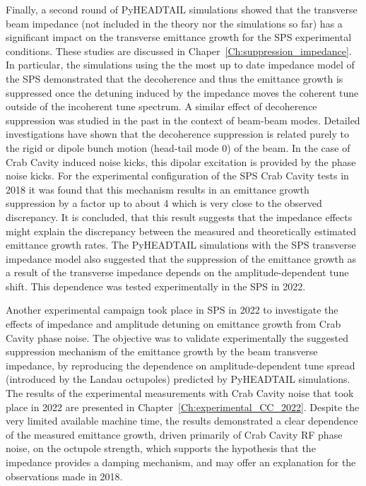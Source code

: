 Finally, a second round of PyHEADTAIL simulations showed that the transverse beam impedance (not included in the theory nor the simulations so far) has a significant impact on the transverse emittance growth for the SPS experimental conditions. These studies are discussed in Chaper~\ref{Ch:suppression_impedance}. In particular, the simulations using the the most up to date impedance model of the SPS demonstrated that the decoherence and thus the emittance growth is suppressed once the detuning induced by the impedance moves the coherent tune outside of the incoherent tune spectrum. A similar effect of decoherence suppression was studied in the past in the context of beam-beam modes. Detailed investigations have shown that the decoherence suppression is related purely to the rigid or dipole bunch motion (head-tail mode 0) of the beam. In the case of Crab Cavity induced noise kicks, this dipolar excitation is provided by the phase noise kicks. For the experimental configuration of the SPS Crab Cavity tests in 2018 it was found that this mechanism results in an emittance growth suppression by a factor up to about 4 which is very close to the observed discrepancy. It is concluded, that this result suggests that the impedance effects might explain the discrepancy between the measured and theoretically estimated emittance growth rates. The PyHEADTAIL simulations with the SPS transverse impedance model also suggested that the suppression of the emittance growth as a result of the transverse impedance depends on the amplitude-dependent tune shift. This dependence was tested experimentally in the SPS in 2022.

Another experimental campaign took place in SPS in 2022 to investigate the effects of impedance and amplitude detuning on emittance growth from Crab Cavity phase noise. The objective was to validate experimentally the suggested suppression mechanism of the emittance growth by the beam transverse impedance, by reproducing the dependence on amplitude-dependent tune spread (introduced by the Landau octupoles) predicted by PyHEADTAIL simulations. 
The results of the experimental measurements with Crab Cavity noise that took place in 2022 are presented in Chapter~\ref{Ch:experimental_CC_2022}. Despite the very limited available machine time, the results demonstrated a clear dependence of the measured emittance growth, driven primarily of Crab Cavity RF phase noise, on the octupole strength, which supports the hypothesis that the impedance provides a damping mechanism, and may offer an explanation for the observations made in 2018.

